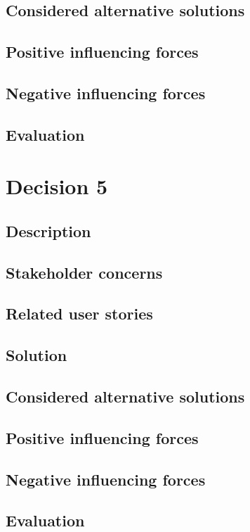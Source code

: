 \documentclass[12pt, a4paper]{article}
\begin{document}
\subsection{Considered alternative solutions}

\subsection{Positive influencing forces}

\subsection{Negative influencing forces}

\subsection{Evaluation}

\newpage
\section{Decision 5}
\subsection{Description}

\subsection{Stakeholder concerns}

\subsection{Related user stories}

\subsection{Solution}

\subsection{Considered alternative solutions}

\subsection{Positive influencing forces}

\subsection{Negative influencing forces}

\subsection{Evaluation}
\end{document}
